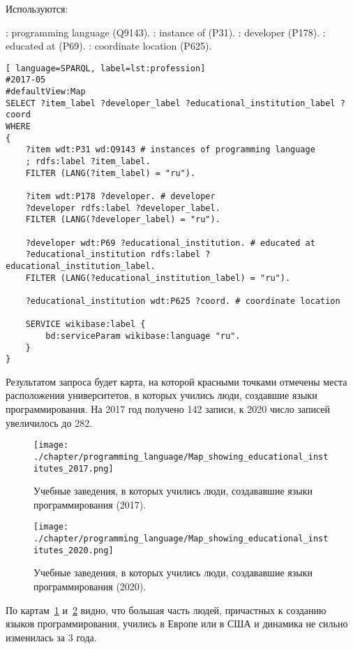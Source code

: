 Используются:
\begin{itemize}
: programming language (Q9143).
: instance of (P31).
: developer (P178).
: educated at (P69).
: coordinate location (P625).
\end{itemize}

\begin{lstlisting}[ language=SPARQL, label=lst:profession]
#2017-05
#defaultView:Map
SELECT ?item_label ?developer_label ?educational_institution_label ?coord
WHERE
{
    ?item wdt:P31 wd:Q9143 # instances of programming language
    ; rdfs:label ?item_label. 
    FILTER (LANG(?item_label) = "ru"). 
    
    ?item wdt:P178 ?developer. # developer
    ?developer rdfs:label ?developer_label. 
    FILTER (LANG(?developer_label) = "ru"). 
    	
    ?developer wdt:P69 ?educational_institution. # educated at
    ?educational_institution rdfs:label ?educational_institution_label. 
    FILTER (LANG(?educational_institution_label) = "ru").
    
    ?educational_institution wdt:P625 ?coord. # coordinate location
    
    SERVICE wikibase:label {
        bd:serviceParam wikibase:language "ru".
    } 	
}
\end{lstlisting}
Результатом запроса будет карта, на которой красными точками отмечены места расположения университетов, в которых учились люди, создавшие языки программирования. На 2017 год получено 142 записи, к 2020 число записей увеличилось до 282.

\begin{figure}[h]
\centering
	\texttt{[image: ./chapter/programming\_language/Map\_showing\_educational\_institutes\_2017.png]}
	\caption{Учебные заведения, в которых учились люди, создававшие языки программирования (2017).}
	\label{fig:universities_2017}
\end{figure}
\begin{figure}[h]
\centering
	\texttt{[image: ./chapter/programming\_language/Map\_showing\_educational\_institutes\_2020.png]}
	\caption{Учебные заведения, в которых учились люди, создававшие языки программирования (2020).}
	\label{fig:universities_2020}
\end{figure}


По картам~\ref{fig:universities_2017} и~\ref{fig:universities_2020} видно, что большая часть людей, причастных к созданию языков программирования, учились в Европе или в США и динамика не сильно изменилась за 3 года.

